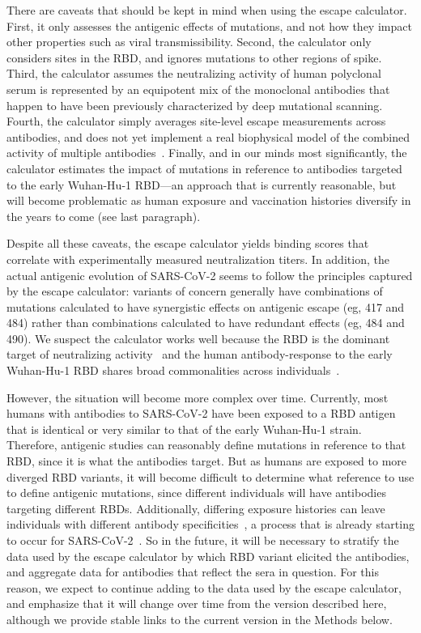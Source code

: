 \documentclass[9pt,twocolumn,twoside]{gsajnl_modified}
\begin{document}
There are caveats that should be kept in mind when using the escape calculator.
First, it only assesses the antigenic effects of mutations, and not how they impact other properties such as viral transmissibility.
Second, the calculator only considers sites in the RBD, and ignores mutations to other regions of spike.
Third, the calculator assumes the neutralizing activity of human polyclonal serum is represented by an equipotent mix of the monoclonal antibodies that happen to have been previously characterized by deep mutational scanning.
Fourth, the calculator simply averages site-level escape measurements across antibodies, and does not yet implement a real biophysical model of the combined activity of multiple antibodies~\citep{einav2020two}.
Finally, and in our minds most significantly, the calculator estimates the impact of mutations in reference to antibodies targeted to the early Wuhan-Hu-1 RBD---an approach that is currently reasonable, but will become problematic as human exposure and vaccination histories diversify in the years to come (see last paragraph).

Despite all these caveats, the escape calculator yields binding scores that correlate with experimentally measured neutralization titers.
In addition, the actual antigenic evolution of SARS-CoV-2 seems to follow the principles captured by the escape calculator: variants of concern generally have combinations of mutations calculated to have synergistic effects on antigenic escape (eg, 417 and 484) rather than combinations calculated to have redundant effects (eg, 484 and 490).
We suspect the calculator works well because the RBD is the dominant target of neutralizing activity~\citep{piccoli2020mapping,greaney2021comprehensive,schmidt2021high} and the human antibody-response to the early Wuhan-Hu-1 RBD shares broad commonalities across individuals~\citep{yuan2020structural,robbiani2020convergent,greaney2021comprehensive,greaney2021mapping,chen2021convergent}.

However, the situation will become more complex over time.
Currently, most humans with antibodies to SARS-CoV-2 have been exposed to a RBD antigen that is identical or very similar to that of the early Wuhan-Hu-1 strain.
Therefore, antigenic studies can reasonably define mutations in reference to that RBD, since it is what the antibodies target.
But as humans are exposed to more diverged RBD variants, it will become difficult to determine what reference to use to define antigenic mutations, since different individuals will have antibodies targeting different RBDs.
Additionally, differing exposure histories can leave individuals with different antibody specificities~\citep{cobey2017immune}, a process that is already starting to occur for SARS-CoV-2~\citep{greaney2021sars}.
So in the future, it will be necessary to stratify the data used by the escape calculator by which RBD variant elicited the antibodies, and aggregate data for antibodies that reflect the sera in question.
For this reason, we expect to continue adding to the data used by the escape calculator, and emphasize that it will change over time from the version described here, although we provide stable links to the current version in the Methods below. 
\end{document}
